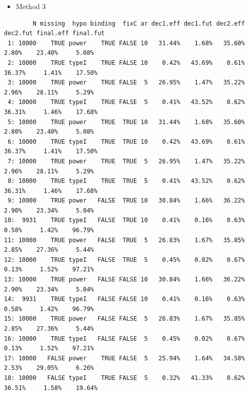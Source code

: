 \documentclass[12pt]{article}
\begin{document}
\begin{itemize}
\item Method 3
\end{itemize}
\begin{verbatim}
        N missing  hypo binding  fixC ar dec1.eff dec1.fut dec2.eff dec2.fut final.eff final.fut
 1: 10000    TRUE power    TRUE FALSE 10   31.44%    1.68%   35.60%    2.80%    23.40%     5.08%
 2: 10000    TRUE typeI    TRUE FALSE 10    0.42%   43.69%    0.61%   36.37%     1.41%    17.50%
 3: 10000    TRUE power    TRUE FALSE  5   26.95%    1.47%   35.22%    2.96%    28.11%     5.29%
 4: 10000    TRUE typeI    TRUE FALSE  5    0.41%   43.52%    0.62%   36.31%     1.46%    17.68%
 5: 10000    TRUE power    TRUE  TRUE 10   31.44%    1.68%   35.60%    2.80%    23.40%     5.08%
 6: 10000    TRUE typeI    TRUE  TRUE 10    0.42%   43.69%    0.61%   36.37%     1.41%    17.50%
 7: 10000    TRUE power    TRUE  TRUE  5   26.95%    1.47%   35.22%    2.96%    28.11%     5.29%
 8: 10000    TRUE typeI    TRUE  TRUE  5    0.41%   43.52%    0.62%   36.31%     1.46%    17.68%
 9: 10000    TRUE power   FALSE  TRUE 10   30.84%    1.66%   36.22%    2.90%    23.34%     5.04%
10:  9931    TRUE typeI   FALSE  TRUE 10    0.41%    0.16%    0.63%    0.58%     1.42%    96.79%
11: 10000    TRUE power   FALSE  TRUE  5   26.83%    1.67%   35.85%    2.85%    27.36%     5.44%
12: 10000    TRUE typeI   FALSE  TRUE  5    0.45%    0.02%    0.67%    0.13%     1.52%    97.21%
13: 10000    TRUE power   FALSE FALSE 10   30.84%    1.66%   36.22%    2.90%    23.34%     5.04%
14:  9931    TRUE typeI   FALSE FALSE 10    0.41%    0.16%    0.63%    0.58%     1.42%    96.79%
15: 10000    TRUE power   FALSE FALSE  5   26.83%    1.67%   35.85%    2.85%    27.36%     5.44%
16: 10000    TRUE typeI   FALSE FALSE  5    0.45%    0.02%    0.67%    0.13%     1.52%    97.21%
17: 10000   FALSE power    TRUE FALSE  5   25.94%    1.64%   34.58%    2.53%    29.05%     6.26%
18: 10000   FALSE typeI    TRUE FALSE  5    0.32%   41.33%    0.62%   36.51%     1.58%    19.64%
\end{verbatim}
\end{document}
